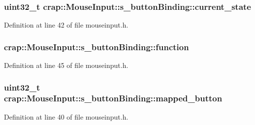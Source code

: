 \subsubsection[{current\+\_\+state}]{\setlength{\rightskip}{0pt plus 5cm}uint32\+\_\+t crap\+::\+Mouse\+Input\+::s\+\_\+button\+Binding\+::current\+\_\+state}\label{structcrap_1_1_mouse_input_1_1s__button_binding_ad9f9c39dfdf90b3d3481838ae318dbe7}


Definition at line 42 of file mouseinput.\+h.

\hypertarget{structcrap_1_1_mouse_input_1_1s__button_binding_a3a605333de8acc3dc5a42d23487760e7}{}
\subsubsection[{function}]{ crap\+::\+Mouse\+Input\+::s\+\_\+button\+Binding\+::function}\label{structcrap_1_1_mouse_input_1_1s__button_binding_a3a605333de8acc3dc5a42d23487760e7}


Definition at line 45 of file mouseinput.\+h.

\hypertarget{structcrap_1_1_mouse_input_1_1s__button_binding_acd16a3ce0186973b469d69dd9ba1c4ca}{}
\subsubsection[{mapped\+\_\+button}]{\setlength{\rightskip}{0pt plus 5cm}uint32\+\_\+t crap\+::\+Mouse\+Input\+::s\+\_\+button\+Binding\+::mapped\+\_\+button}\label{structcrap_1_1_mouse_input_1_1s__button_binding_acd16a3ce0186973b469d69dd9ba1c4ca}


Definition at line 40 of file mouseinput.\+h.

\hypertarget{structcrap_1_1_mouse_input_1_1s__button_binding_a7828977e7c16c4c4a8df06aa0c7f6491}{}
